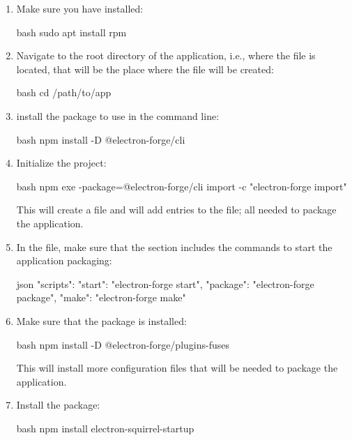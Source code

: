 \begin{enumerate}
    \item Make sure you have  installed:
    \begin{mintedbox}{bash}
sudo apt install rpm
    \end{mintedbox}
    \item Navigate to the root directory of the application, i.e., where the
     file is located, that will be the place where the
     file will be created:
    \begin{mintedbox}{bash}
cd /path/to/app
    \end{mintedbox}
    \item install the  package to use in the command line:
    \begin{mintedbox}{bash}
npm install -D @electron-forge/cli
    \end{mintedbox}
    \item Initialize the  project:
    \begin{mintedbox}{bash}
npm exe -package=@electron-forge/cli import -c "electron-forge import"
    \end{mintedbox}
    This will create a  file and will add entries to the
     file; all needed to package the application.
    \item In the  file, make sure that the 
    section includes the commands to start the application packaging:
    \begin{mintedbox}{json}
"scripts": {
    "start": "electron-forge start",
    "package": "electron-forge package",
    "make": "electron-forge make"
}
    \end{mintedbox}
    \item Make sure that the  package is installed:
    \begin{mintedbox}{bash}
npm install -D @electron-forge/plugins-fuses
    \end{mintedbox}
    This will install more configuration files that will be needed to package the application.
    \item Install the  package:
    \begin{mintedbox}{bash}
npm install electron-squirrel-startup
    \end{mintedbox}

\end{enumerate}
